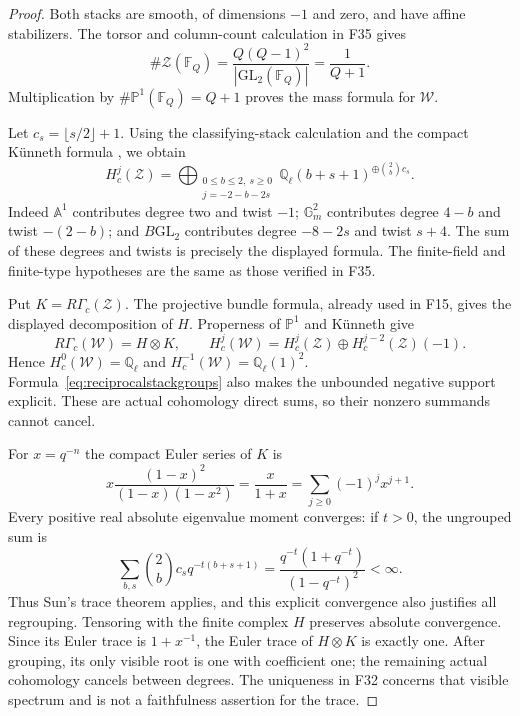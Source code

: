 \documentclass[11pt,a4paper]{article}
\newcommand{\Q}{\mathbb Q}\newcommand{\Z}{\mathbb Z}\newcommand{\C}{\mathbb C}\newcommand{\N}{\mathbb N}\newcommand{\F}{\mathbb F}
\newcommand{\A}{\mathbb A}\newcommand{\PP}{\mathbb P}\newcommand{\GL}{\mathrm{GL}}
\newcommand{\fid}[1]{\textsf{#1}}\newcommand{\gate}[1]{\textsf{#1}}
\theoremstyle{named}\newtheorem{finding}{Finding}[section]
\theoremstyle{definition}\newtheorem{definition}[finding]{Definition}
\theoremstyle{remark}\newtheorem{remark}[finding]{Remark}
\begin{document}
\begin{proof}
Both stacks are smooth, of dimensions $-1$ and zero, and have
affine stabilizers. The torsor and column-count calculation in
\fid{F35} gives
\[
 \#\mathcal Z(\F_Q)
 =\frac{Q(Q-1)^2}{|\GL_2(\F_Q)|}
 =\frac1{Q+1}.
\]
Multiplication by $\#\mathbb P^1(\F_Q)=Q+1$ proves the mass
formula for $\mathcal W$.

Let $c_s=\lfloor s/2\rfloor+1$. Using the classifying-stack
calculation \cite[Example~7.4, p.~109]{SunStacks} and the compact
K\"unneth formula \cite[Theorem~11.0.14, p.~204]{LO2}, we obtain
\begin{equation}\label{eq:reciprocalstackgroups}
 H_c^j(\mathcal Z)=
 \bigoplus_{\substack{0\le b\le2,\ s\ge0\\j=-2-b-2s}}
 \Q_\ell(b+s+1)^{\oplus\binom2b c_s}.
\end{equation}
Indeed $\A^1$ contributes degree two and twist $-1$;
$\mathbb G_m^2$ contributes degree $4-b$ and twist $-(2-b)$;
and $B\GL_2$ contributes degree $-8-2s$ and twist $s+4$.
The sum of these degrees and twists is precisely the displayed
formula. The finite-field and finite-type hypotheses are the
same as those verified in \fid{F35}.

Put $K=R\Gamma_c(\mathcal Z)$. The projective bundle formula,
already used in \fid{F15}, gives the displayed decomposition of $H$.
Properness of $\mathbb P^1$ and K\"unneth give
\[
 R\Gamma_c(\mathcal W)=H\otimes K,\qquad
 H_c^j(\mathcal W)=H_c^j(\mathcal Z)
       \oplus H_c^{j-2}(\mathcal Z)(-1).
\]
Hence $H_c^0(\mathcal W)=\Q_\ell$ and
$H_c^{-1}(\mathcal W)=\Q_\ell(1)^2$.
Formula~\eqref{eq:reciprocalstackgroups} also makes the unbounded
negative support explicit. These are actual cohomology direct sums,
so their nonzero summands cannot cancel.

For $x=q^{-n}$ the compact Euler series of $K$ is
\[
 x\frac{(1-x)^2}{(1-x)(1-x^2)}
   =\frac{x}{1+x}
   =\sum_{j\ge0}(-1)^j x^{j+1}.
\]
Every positive real absolute eigenvalue moment converges: if $t>0$,
the ungrouped sum is
\[
 \sum_{b,s}\binom2b c_s q^{-t(b+s+1)}
 =\frac{q^{-t}(1+q^{-t})}{(1-q^{-t})^2}<\infty.
\]
Thus Sun's trace theorem applies, and this explicit convergence
also justifies all regrouping. Tensoring with the finite complex
$H$ preserves absolute convergence. Since its Euler trace is
$1+x^{-1}$, the Euler trace of $H\otimes K$ is exactly one.
After grouping, its only visible root is one with coefficient one;
the remaining actual cohomology cancels between degrees. The
uniqueness in \fid{F32} concerns that visible spectrum and is not
a faithfulness assertion for the trace.


\end{proof}
\end{document}
